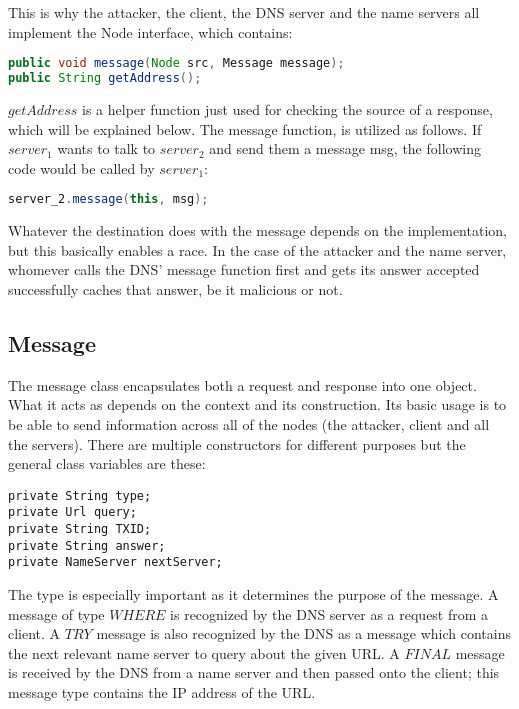 \documentclass[a4paper, 12pt]{article} %
\begin{document}
This is why the attacker, the client, the DNS server and the name servers all implement the Node interface, which contains:

\begin{lstlisting}[language=Java]
public void message(Node src, Message message);
public String getAddress();
\end{lstlisting}

$getAddress$ is a helper function just used for checking the source of a response, which will be explained below. The message function, is utilized as follows. If $server_1$ wants to talk to $server_2$ and send them a message msg, the following code would be called by $server_1$:

\begin{lstlisting}[language=Java]
server_2.message(this, msg);	
\end{lstlisting}

Whatever the destination does with the message depends on the implementation, but this basically enables a race. In the case of the attacker and the name server, whomever calls the DNS' message function first and gets its answer accepted successfully caches that answer, be it malicious or not.

\subsection*{Message}

The message class encapsulates both a request and response into one object. What it acts as depends on the context and its construction. Its basic usage is to be able to send information across all of the nodes (the attacker, client and all the servers). There are multiple constructors for different purposes but the general class variables are these:

\begin{lstlisting}
private String type;
private Url query;
private String TXID;
private String answer;
private NameServer nextServer;	
\end{lstlisting}

The type is especially important as it determines the purpose of the message. A message of type $WHERE$ is recognized by the DNS server as a request from a client. A $TRY$ message is also recognized by the DNS as a message which contains the next relevant name server to query about the given URL. A $FINAL$ message is received by the DNS from a name server and then passed onto the client; this message type contains the IP address of the URL.
\end{document}
